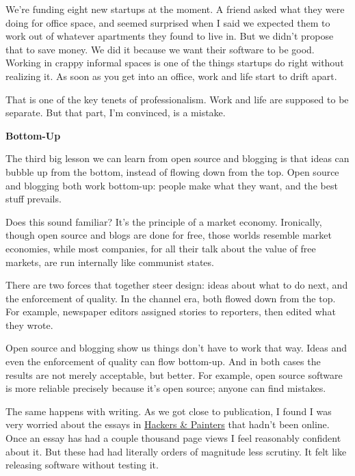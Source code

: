 We're funding eight new
                  startups at the moment. A friend asked what they were doing
                  for office space, and seemed surprised when I said we expected
                  them to work out of whatever apartments they found to live in.
                  But we didn't propose that to save money. We did it because we
                  want their software to be good. Working in crappy informal
                  spaces is one of the things startups do right without
                  realizing it. As soon as you get into an office, work and life
                  start to drift apart.

That is one of the key tenets
                  of professionalism. Work and life are supposed to be separate.
                  But that part, I'm convinced, is a mistake.

\textbf{Bottom-Up}

The third big lesson we can learn from open
                  source and blogging is that ideas can bubble up from the
                  bottom, instead of flowing down from the top. Open source and
                  blogging both work bottom-up: people make what they want, and
                  the best stuff prevails.

Does this sound familiar?
                  It's the principle of a market economy. Ironically, though
                  open source and blogs are done for free, those worlds resemble
                  market economies, while most companies, for all their talk
                  about the value of free markets, are run internally like
                  communist states.

There are two forces that
                  together steer design: ideas about what to do next, and the
                  enforcement of quality. In the channel era, both flowed down
                  from the top. For example, newspaper editors assigned stories
                  to reporters, then edited what they wrote.

Open
                  source and blogging show us things don't have to work that
                  way. Ideas and even the enforcement of quality can flow
                  bottom-up. And in both cases the results are not merely
                  acceptable, but better. For example, open source software is
                  more reliable precisely because it's open source; anyone can
                  find mistakes.

The same happens with writing. As we
                  got close to publication, I found I was very worried about the
                  essays in
                  \href{http://www.amazon.com/exec/obidos/tg/detail/-/0596006624}{Hackers \& Painters}
                  that hadn't been online. Once an essay has had a couple
                  thousand page views I feel reasonably confident about it. But
                  these had had literally orders of magnitude less scrutiny. It
                  felt like releasing software without testing it.

